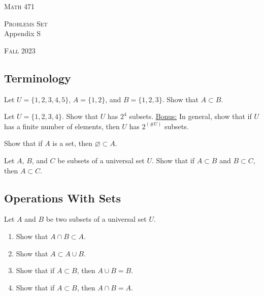 


\hrulefill

\begin{minipage}{0.33\textwidth}
\textsc{Math 471}
\end{minipage} \hfill 
\begin{minipage}{0.32\textwidth}
\centering
\textsc{Problems Set} \\
Appendix S
\end{minipage}
 \hfill 
 \begin{minipage}{0.33\textwidth}
 \flushright \textsc{Fall 2023}
 \end{minipage}

\hrulefill

\setcounter{section}{19}

\subsection{Terminology}

\begin{problem}
Let $U = \{1 , 2, 3, 4, 5 \}$, $A = \{ 1 , 2 \}$, and $B = \{ 1 , 2, 3\}$. Show that $A \subset B$.
\end{problem}

\begin{problem}
Let $U = \{ 1 , 2, 3, 4\}$. Show that $U$ has $2^4$ subsets. \underline{Bonus:} In general, show that if $U$ has a finite number of elements, then $U$ has $2^{(\#U)}$ subsets.
\end{problem}

\begin{problem}
Show that if $A$ is a set, then $\varnothing \subset A$.
\end{problem}

\begin{problem}
Let $A$, $B$, and $C$ be subsets of a universal set $U$. Show that if $A \subset B$ and $B \subset C$, then $A \subset C$.
\end{problem}

\subsection{Operations With Sets}

\begin{problem}
Let $A$ and $B$ be two subsets of a universal set $U$.
    \begin{enumerate}[label=\alph*)]
        \item Show that $A \cap B \subset A$.
        \item Show that $A \subset A \cup B$.
        \item Show that if $A \subset B$, then $A \cup B = B$.
        \item Show that if $A \subset B$, then $A \cap B = A$.
    \end{enumerate}
\end{problem}

